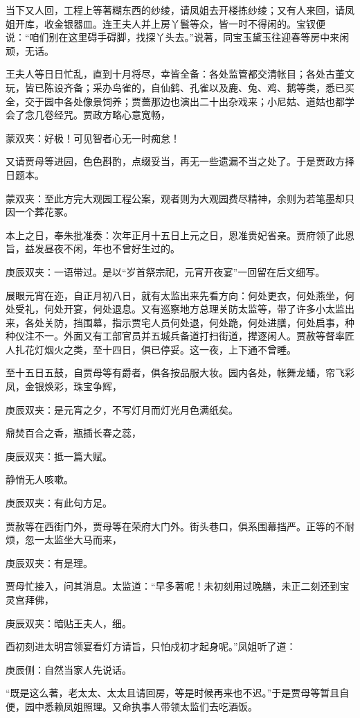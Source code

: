 \begin{parag}
    当下又人回，工程上等著糊东西的纱绫，请凤姐去开楼拣纱绫；又有人来回，请凤姐开库，收金银器皿。连王夫人并上房丫鬟等众，皆一时不得闲的。宝钗便说：“咱们别在这里碍手碍脚，找探丫头去。”说著，同宝玉黛玉往迎春等房中来闲顽，无话。
\end{parag}


\begin{parag}
    王夫人等日日忙乱，直到十月将尽，幸皆全备：各处监管都交清帐目；各处古董文玩，皆已陈设齐备；采办鸟雀的，自仙鹤、孔雀以及鹿、兔、鸡、鹅等类，悉已买全，交于园中各处像景饲养；贾蔷那边也演出二十出杂戏来；小尼姑、道姑也都学会了念几卷经咒。贾政方略心意宽畅，\begin{note}蒙双夹：好极！可见智者心无一时痴怠！\end{note}又请贾母等进园，色色斟酌，点缀妥当，再无一些遗漏不当之处了。于是贾政方择日题本。\begin{note}蒙双夹：至此方完大观园工程公案，观者则为大观园费尽精神，余则为若笔墨却只因一个葬花冢。\end{note}本上之日，奉朱批准奏：次年正月十五日上元之日，恩准贵妃省亲。贾府领了此恩旨，益发昼夜不闲，年也不曾好生过的。\begin{note}庚辰双夹：一语带过。是以“岁首祭宗祀，元宵开夜宴”一回留在后文细写。\end{note}
\end{parag}


\begin{parag}
    展眼元宵在迩，自正月初八日，就有太监出来先看方向：何处更衣，何处燕坐，何处受礼，何处开宴，何处退息。又有巡察地方总理关防太监等，带了许多小太监出来，各处关防，挡围幕，指示贾宅人员何处退，何处跪，何处进膳，何处启事，种种仪注不一。外面又有工部官员并五城兵备道打扫街道，撵逐闲人。贾赦等督率匠人扎花灯烟火之类，至十四日，俱已停妥。这一夜，上下通不曾睡。
\end{parag}


\begin{parag}
    至十五日五鼓，自贾母等有爵者，俱各按品服大妆。园内各处，帐舞龙蟠，帘飞彩凤，金银焕彩，珠宝争辉，\begin{note}庚辰双夹：是元宵之夕，不写灯月而灯光月色满纸矣。\end{note}鼎焚百合之香，瓶插长春之蕊，\begin{note}庚辰双夹：抵一篇大赋。\end{note}静悄无人咳嗽。\begin{note}庚辰双夹：有此句方足。\end{note}贾赦等在西街门外，贾母等在荣府大门外。街头巷口，俱系围幕挡严。正等的不耐烦，忽一太监坐大马而来，\begin{note}庚辰双夹：有是理。\end{note}贾母忙接入，问其消息。太监道：“早多著呢！未初刻用过晚膳，未正二刻还到宝灵宫拜佛，\begin{note}庚辰双夹：暗贴王夫人，细。\end{note}酉初刻进太明宫领宴看灯方请旨，只怕戍初才起身呢。”凤姐听了道：\begin{note}庚辰侧：自然当家人先说话。\end{note}“既是这么著，老太太、太太且请回房，等是时候再来也不迟。”于是贾母等暂且自便，园中悉赖凤姐照理。又命执事人带领太监们去吃酒饭。
\end{parag}


